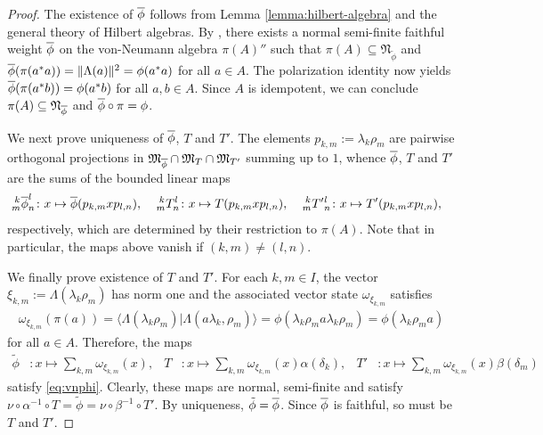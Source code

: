 \begin{proof}
  The existence of $\vnphi$ follows from Lemma
  \ref{lemma:hilbert-algebra} and the general theory of Hilbert
  algebras. By \cite{}, there exists a normal semi-finite faithful
  weight $\vnphi$ on the von-Neumann algebra $\pi(A)''$ such that
  $\pi(A) \subseteq \mathfrak{N}_{\tilde \phi}$ and
  $\vnphi(\pi(a^{*}a))=\|\Lambda(a)\|^{2}=\phi(a^{*}a)$ for all $a\in
  A$. The polarization identity now yields $\vnphi(\pi(a^{*}b)) =
  \phi(a^{*}b)$ for all $a,b\in A$. Since $A$ is idempotent, we can
  conclude $\pi(A) \subseteq \mathfrak{N}_{\vnphi}$ and $\vnphi\circ
  \pi=\phi$.

  We next prove uniqueness of $\vnphi$, $T$ and $T'$.  The elements
  $p_{k,m}:=\lambda_{k}\rho_{m}$ are pairwise orthogonal
  projections in $\mathfrak{M}_{\vnphi} \cap \mathfrak{M}_{T} \cap
  \mathfrak{M}_{T'}$ summing up to $1$, whence $\vnphi$, $T$ and $T'$
  are the sums of the bounded linear maps
  \begin{align*}
    \Gr{\vnphi}{k}{l}{m}{n}&\colon x\mapsto \vnphi(p_{k,m}xp_{l,n}),  &
    \Gr{T}{k}{l}{m}{n} &\colon x \mapsto T(p_{k,m}xp_{l,n}), &
    \Gr{T'{}}{k}{l}{m}{n} &\colon x\mapsto T'(p_{k,m}xp_{l,n}),
  \end{align*}
  respectively, which are determined by their restriction to
  $\pi(A)$. Note that in particular, the maps above vanish if
  $(k,m)\neq (l,n)$.
  
  We finally prove existence of $T$ and $T'$. For each $k,m\in I$, the vector
  $\xi_{k,m}:=\Lambda(\lambda_{k}\rho_{m})$ has norm one and the
  associated vector state $\omega_{\xi_{k,m}}$ satisfies
  \begin{align*}
    \omega_{\xi_{k,m}}(\pi(a))= \langle
    \Lambda(\lambda_{k}\rho_{m})|\Lambda(a\lambda_{k},\rho_{m})\rangle
    = \phi(\lambda_{k}\rho_{m}a\lambda_{k}\rho_{m} )=
    \phi(\lambda_{k}\rho_{m}a)
  \end{align*}
  for all $a\in A$. Therefore, the maps
  \begin{align} \label{eq:vnphi-explicit}
\tilde\phi&\colon x\mapsto\sum_{k,m} \omega_{\xi_{k,m}}(x), &
    T&\colon x\mapsto \sum_{k,m}
    \omega_{\xi_{k,m}}(x)\alpha(\delta_{k}), & T'&\colon x\mapsto
    \sum_{k,m} \omega_{\xi_{k,m}}(x) \beta(\delta_{m})
  \end{align}
  satisfy \eqref{eq:vnphi}. Clearly, these maps are normal,
  semi-finite and satisfy $\nu \circ \alpha^{-1}\circ T = \tilde\phi = \nu
  \circ \beta^{-1} \circ T'$.  By uniqueness, $\tilde
  \phi=\vnphi$. Since $\vnphi$ is faithful, so must be $T$ and $T'$.
\end{proof}
